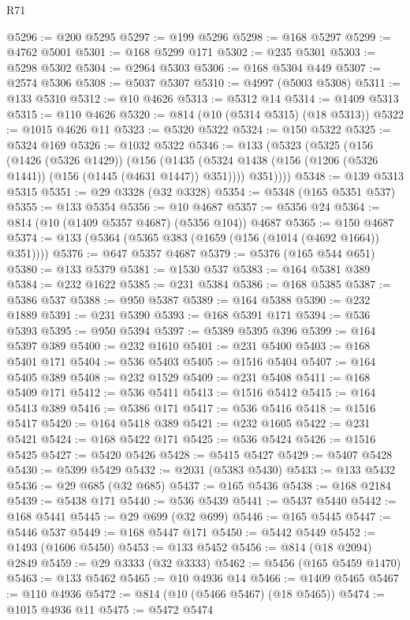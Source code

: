 \begin{lexlean}{R71}
\begin{coremodule}
@5296 := @200 @5295
@5297 := @199 @5296
@5298 := @168 @5297
@5299 := @4762 @5001
@5301 := @168 @5299 @171
@5302 := @235 @5301
@5303 := @5298 @5302
@5304 := @2964 @5303
@5306 := @168 @5304 @449
@5307 := @2574 @5306
@5308 := @5037 @5307
@5310 := @4997 (@5003 @5308)
@5311 := @133 @5310
@5312 := @10 @4626
@5313 := @5312 @14
@5314 := @1409 @5313
@5315 := @110 @4626
@5320 := @814 (@10 (@5314 @5315) (@18 @5313))
@5322 := @1015 @4626 @11
@5323 := @5320 @5322
@5324 := @150 @5322
@5325 := @5324 @169
@5326 := @1032 @5322
@5346 := @133
    (@5323
      (@5325
        (@156
          (@1426 (@5326 @1429))
          (@156
            (@1435 (@5324 @1438 (@156 (@1206 (@5326 @1441)) (@156 (@1445 (@4631 @1447)) @351))))
            @351))))
@5348 := @139 @5313 @5315
@5351 := @29 @3328 (@32 @3328)
@5354 := @5348 (@165 @5351 @537)
@5355 := @133 @5354
@5356 := @10 @4687
@5357 := @5356 @24
@5364 := @814 (@10 (@1409 @5357 @4687) (@5356 @104)) @4687
@5365 := @150 @4687
@5374 := @133 (@5364 (@5365 @383 (@1659 (@156 (@1014 (@4692 @1664)) @351))))
@5376 := @647 @5357 @4687
@5379 := @5376 (@165 @544 @651)
@5380 := @133 @5379
@5381 := @1530 @537
@5383 := @164 @5381 @389
@5384 := @232 @1622
@5385 := @231 @5384
@5386 := @168 @5385
@5387 := @5386 @537
@5388 := @950 @5387
@5389 := @164 @5388
@5390 := @232 @1889
@5391 := @231 @5390
@5393 := @168 @5391 @171
@5394 := @536 @5393
@5395 := @950 @5394
@5397 := @5389 @5395 @396
@5399 := @164 @5397 @389
@5400 := @232 @1610
@5401 := @231 @5400
@5403 := @168 @5401 @171
@5404 := @536 @5403
@5405 := @1516 @5404
@5407 := @164 @5405 @389
@5408 := @232 @1529
@5409 := @231 @5408
@5411 := @168 @5409 @171
@5412 := @536 @5411
@5413 := @1516 @5412
@5415 := @164 @5413 @389
@5416 := @5386 @171
@5417 := @536 @5416
@5418 := @1516 @5417
@5420 := @164 @5418 @389
@5421 := @232 @1605
@5422 := @231 @5421
@5424 := @168 @5422 @171
@5425 := @536 @5424
@5426 := @1516 @5425
@5427 := @5420 @5426
@5428 := @5415 @5427
@5429 := @5407 @5428
@5430 := @5399 @5429
@5432 := @2031 (@5383 @5430)
@5433 := @133 @5432
@5436 := @29 @685 (@32 @685)
@5437 := @165 @5436
@5438 := @168 @2184
@5439 := @5438 @171
@5440 := @536 @5439
@5441 := @5437 @5440
@5442 := @168 @5441
@5445 := @29 @699 (@32 @699)
@5446 := @165 @5445
@5447 := @5446 @537
@5449 := @168 @5447 @171
@5450 := @5442 @5449
@5452 := @1493 (@1606 @5450)
@5453 := @133 @5452
@5456 := @814 (@18 @2094) @2849
@5459 := @29 @3333 (@32 @3333)
@5462 := @5456 (@165 @5459 @1470)
@5463 := @133 @5462
@5465 := @10 @4936 @14
@5466 := @1409 @5465
@5467 := @110 @4936
@5472 := @814 (@10 (@5466 @5467) (@18 @5465))
@5474 := @1015 @4936 @11
@5475 := @5472 @5474

\end{coremodule}
\end{lexlean}
